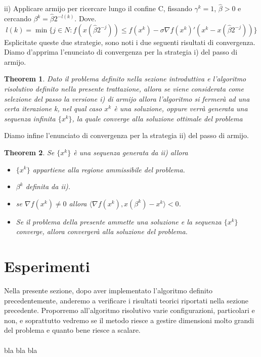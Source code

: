 \documentclass{article}
\newtheorem{theorem}{Theorem}[section]
\begin{document}
ii) Applicare armijo per ricercare lungo il confine C, fissando $\gamma^k = 1$, ${\hat{\beta} > 0}$ e cercando $\beta^k =\hat{\beta}2^{-l(k)}$. Dove. 
\[l(k) = \min \{j \in N : f(x(\hat{\beta}2^{-j})) \leq f(x^k) - \sigma \nabla f(x^k)'(x^k - x(\hat{\beta}2^{-j})) \}\]
Esplicitate queste due strategie, sono noti i due seguenti risultati di convergenza.\\
Diamo d'apprima l'enunciato di convergenza per la strategia i) del passo di armijo.
\begin{theorem}
Dato il problema definito nella sezione introduttiva e l'algoritmo risolutivo definito nella presente trattazione, allora se viene considerata come selezione del passo la versione i) di armijo allora l'algoritmo si fermerà ad una certa iterazione k, nel qual caso $x^k$ è una soluzione, oppure verrà generata una sequenza infinita $\{x^k\}$, la quale converge alla soluzione ottimale del problema
\end{theorem}
Diamo infine l'enunciato di convergenza per la strategia ii) del passo di armijo.
\begin{theorem}
Se $\{x^k\}$ è una sequenza generata da ii) allora\\
\begin{itemize}
    \item $\{x^k\}$ appartiene alla regione ammissibile del problema.
    \item $\beta^k$ definita da ii).
    \item se $\nabla f(x^k) \neq 0$ allora $\langle \nabla f(x^k), x(\beta^k) - x^k \rangle < 0$.
    \item Se il problema della presente ammette una soluzione e la sequenza $\{x^k\}$ converge, allora convergerà alla soluzione del problema.
\end{itemize}
\end{theorem}
\section{Esperimenti}
Nella presente sezione, dopo aver implementato l'algoritmo definito precedentemente, anderemo a verificare i risultati teorici riportati nella sezione precedente. Proporremo all'algoritmo risolutivo varie configurazioni, particolari e non, e soprattutto vedremo se il metodo riesce a gestire dimensioni molto grandi del problema e quanto bene riesce a scalare.\\\\
bla bla bla


\end{document}
